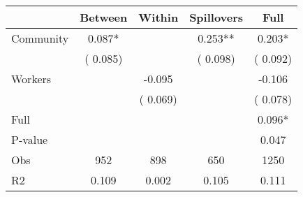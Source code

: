 
\begin{tabular}{l*{4}{c}}\hline&\multicolumn{1}{c}{Between}&\multicolumn{1}{c}{Within}&\multicolumn{1}{c}{Spillovers}&\multicolumn{1}{c}{Full}\\ \hline
 Community             &              0.087*      &                                               &        0.253** &         0.203*                            \\ 
                               &        (       0.085)           &                                       &       (       0.098)     &      (       0.092)                                           \\ 
 Workers       &                                               &       -0.095    &                                &            -0.106                            \\ 
                               &                                               & (       0.069)                  &                                        &      (       0.078)                                           \\ 
\hline                                                                                                                                                                                                                                            
 Full                  &                                               &                                               &                                        &             0.096*                                     \\ 
 P-value               &                                               &                                               &                                        &             0.047                                           \\ 
 Obs                   &               952               &       898                       &       650                &              1250                                               \\ 
 R2                    &                      0.109              &              0.002                      &              0.105               &                     0.111                                              \\ 
\hline \end{tabular}                                                                                                                                                                                                              